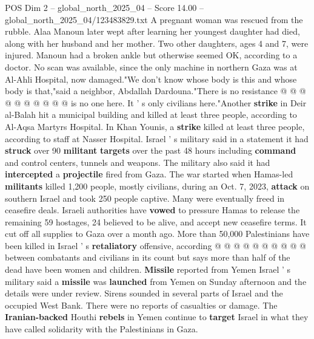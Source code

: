 \begin{textsample}{POS Dim 2 – global\_north\_2025\_04 – Score 14.00 – global\_north\_2025\_04/123483829.txt}
A pregnant woman was rescued from the rubble.
Alaa Manoun later wept after learning her youngest daughter had died, along with her husband and her mother.
Two other daughters, ages 4 and 7, were injured.
Manoun had a broken ankle but otherwise seemed OK, according to a doctor.
No scan was available, since the only machine in northern Gaza was at Al-Ahli Hospital, now damaged."We don't know whose body is this and whose body is that,"said a neighbor, Abdallah Dardouna."There is no resistance @ @ @ @ @ @ @ @ @ @ is no one here.
It ' s only civilians here."Another \textbf{strike} in Deir al-Balah hit a municipal building and killed at least three people, according to Al-Aqsa Martyrs Hospital.
In Khan Younis, a \textbf{strike} killed at least three people, according to staff at Nasser Hospital.
Israel ' s military said in a statement it had \textbf{struck} over 90 \textbf{militant} \textbf{targets} over the past 48 hours including \textbf{command} and control centers, tunnels and weapons.
The military also said it had \textbf{intercepted} a \textbf{projectile} fired from Gaza.
The war started when Hamas-led \textbf{militants} killed 1,200 people, mostly civilians, during an Oct. 7, 2023, \textbf{attack} on southern Israel and took 250 people captive.
Many were eventually freed in ceasefire deals.
Israeli authorities have \textbf{vowed} to pressure Hamas to release the remaining 59 hostages, 24 believed to be alive, and accept new ceasefire terms.
It cut off all supplies to Gaza over a month ago.
More than 50,000 Palestinians have been killed in Israel ' s \textbf{retaliatory} offensive, according @ @ @ @ @ @ @ @ @ @ between combatants and civilians in its count but says more than half of the dead have been women and children. \textbf{Missile} reported from Yemen Israel ' s military said a \textbf{missile} was \textbf{launched} from Yemen on Sunday afternoon and the details were under review.
Sirens sounded in several parts of Israel and the occupied West Bank.
There were no reports of casualties or damage.
The \textbf{Iranian-backed} Houthi \textbf{rebels} in Yemen continue to \textbf{target} Israel in what they have called solidarity with the Palestinians in Gaza.

\end{textsample}
